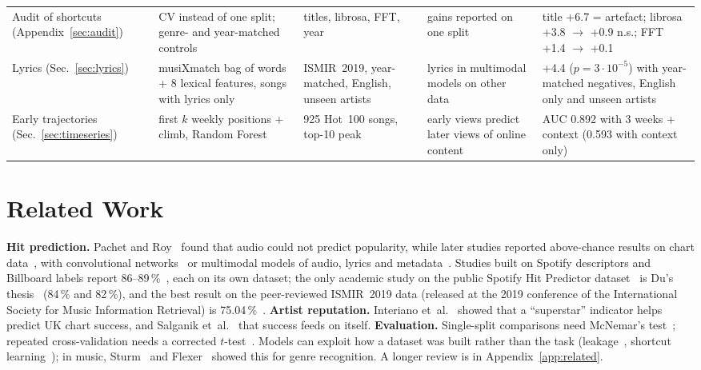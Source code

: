 \documentclass[conference]{IEEEtran}
\begin{document}
\begin{table}[t]
\begin{tabular}{@{}>{\raggedright\arraybackslash}p{2.6cm}>{\raggedright\arraybackslash}p{4.1cm}>{\raggedright\arraybackslash}p{3.3cm}>{\raggedright\arraybackslash}p{3.1cm}>{\raggedright\arraybackslash}p{3.5cm}@{}}
Audit of shortcuts (Appendix~\ref{sec:audit}) & CV instead of one split; genre- and year-matched controls & titles, librosa, FFT, year & gains reported on one split & title +6.7 = artefact; librosa +3.8 $\to$ +0.9 n.s.; FFT +1.4 $\to$ +0.1 \\
Lyrics (Sec.~\ref{sec:lyrics}) & musiXmatch bag of words + 8 lexical features, songs with lyrics only & ISMIR~2019, year-matched, English, unseen artists & lyrics in multimodal models on other data~\cite{zhao2023analysis,nofer2026deephits} & +4.4 ($p=3{\cdot}10^{-5}$) with year-matched negatives, English only and unseen artists \\
Early trajectories (Sec.~\ref{sec:timeseries}) & first $k$ weekly positions + climb, Random Forest & 31{,}925 Hot~100 songs, top-10 peak & early views predict later views of online content~\cite{szabo2010predicting} & AUC 0.892 with 3 weeks + context (0.593 with context only) \\
\bottomrule
\end{tabular}
\end{table}

\section{Related Work}
\textbf{Hit prediction.} Pachet and Roy~\cite{pachet2008hit} found that audio could not predict popularity, while
later studies reported above-chance results on chart data~\cite{ni2011hit,herremans2014dance}, with convolutional
networks~\cite{yang2017revisiting} or multimodal models of audio, lyrics and metadata~\cite{zangerle2019hit,
martingutierrez2020multimodal,nofer2026deephits}. Studies built on Spotify descriptors and Billboard labels report
86--89\,\%~\cite{middlebrook2019song,dimolitsas2023spothitpy,zhao2023analysis}, each on its own dataset; the only
academic study on the public Spotify Hit Predictor dataset~\cite{ansari2020dataset} is Du's thesis~\cite{du2022spotify}
(84\,\% and 82\,\%), and the best result on the peer-reviewed ISMIR~2019 data (released at the 2019 conference of the International
Society for Music Information Retrieval) is 75.04\,\%~\cite{zangerle2019hit}.
\textbf{Artist reputation.} Interiano et~al.~\cite{interiano2018musical} showed that a ``superstar'' indicator helps
predict UK chart success, and Salganik et~al.~\cite{salganik2006experimental} that success feeds on itself.
\textbf{Evaluation.} Single-split comparisons need McNemar's test~\cite{dietterich1998approximate}; repeated
cross-validation needs a corrected $t$-test~\cite{nadeau2003inference}. Models can exploit how a dataset was built
rather than the task (leakage~\cite{kaufman2012leakage}, shortcut learning~\cite{geirhos2020shortcut}); in music,
Sturm~\cite{sturm2014simple} and Flexer~\cite{flexer2007closer} showed this for genre recognition. A longer review is
in Appendix~\ref{app:related}.
\end{document}
